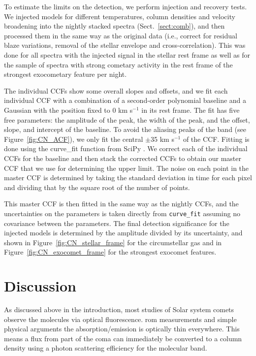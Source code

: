 \documentclass{aa}
\newcommand{\kms}{km s$^{-1}$}
\begin{document}
To estimate the limits on the  detection, we perform injection and recovery tests.
%
We injected models for different temperatures, column densities and velocity broadening into the nightly stacked spectra (Sect.~\ref{sect:comb}), and then processed them in the same way as the original data (i.e., correct for residual blaze variations, removal of the stellar envelope and cross-correlation).
%
This was done for all spectra with the injected signal in the stellar rest frame as well as for the sample of spectra with strong cometary activity in the rest frame of the strongest exocometary feature per night.

The individual CCFs show some overall slopes and offsets, and we fit each individual CCF with a combination of a second-order polynomial baseline and a Gaussian with the position fixed to 0 \kms{} in its rest frame.
%
The fit has five free parameters: the amplitude of the peak, the width of the peak, and the offset, slope, and intercept of the baseline.
%
To avoid the aliasing peaks of the  band (see Figure~\ref{fig:CN_ACF}), we only fit the central $\pm$35 \kms{} of the CCF.
%
Fitting is done using the curve\_fit function from SciPy \citep{2020SciPy-NMeth}.
%
We correct each of the individual CCFs for the baseline and then stack the corrected CCFs to obtain our master CCF that we use for determining the upper limit.
%
The noise on each point in the master CCF is determined by taking the standard deviation in time for each pixel and dividing that by the square root of the number of points.

This master CCF is then fitted in the same way as the nightly CCFs, and the uncertainties on the parameters is taken directly from {\tt curve\_fit} assuming no covariance between the parameters.
%
The final detection significance for the injected models is determined by the amplitude divided by its uncertainty, and shown in Figure~\ref{fig:CN_stellar_frame} for the circumstellar gas and in Figure~\ref{fig:CN_exocomet_frame} for the strongest exocomet features.

\section{Discussion}\label{sec:discuss}

As discussed above in the introduction, most studies of Solar system comets observe the  molecules via optical fluorescence. 
%
rom measurements and simple physical arguments the  absorption/emission is optically thin everywhere.
%
This means a flux from part of the coma can immediately be converted to a column density using a photon scattering efficiency for the molecular band.
\end{document}
